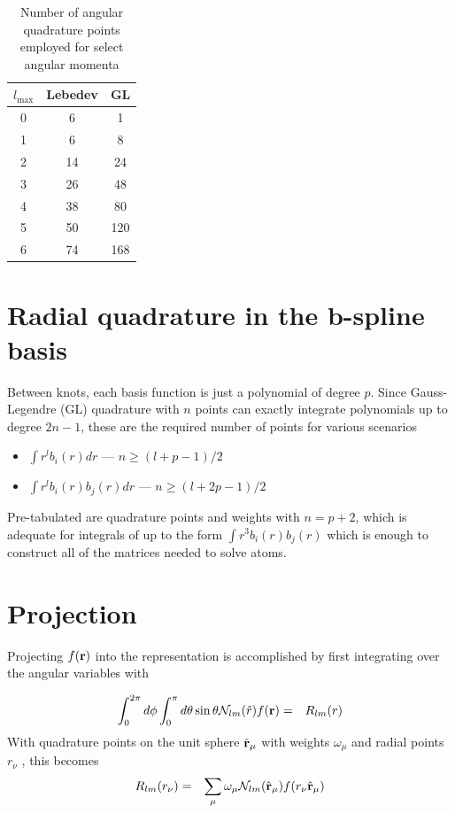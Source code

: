 \documentclass[12pt]{article}
\newcommand{\N}{\mathcal{N}}
\begin{document}
\begin{table}
  \begin{center}
  \caption{Number of angular quadrature points employed for select angular momenta}
  \begin{tabular}{ccc}
    $l_{\mbox{max}}$ & Lebedev & GL  \\ \hline
    0 & 6 & 1 \\
    1 & 6 & 8 \\
    2 & 14 & 24 \\
    3 & 26 & 48 \\
    4 & 38 & 80 \\
    5 & 50 & 120 \\
    6 & 74 & 168 \\ \hline
  \end{tabular}
  \end{center}
\end{table}

\section{Radial quadrature in the b-spline basis}

Between knots, each basis function is just a polynomial of degree $p$.  Since Gauss-Legendre (GL) quadrature with $n$ points can exactly integrate polynomials up to degree $2n-1$, these are the required number of points for various scenarios
\begin{itemize}
\item $\int r^l b_i(r) dr$ --- $n \ge (l+p-1)/2$
\item $\int r^l b_i(r) b_j(r) dr$ --- $n \ge (l+2p-1)/2$
\end{itemize}
Pre-tabulated are quadrature points and weights with $n=p+2$, which is adequate for integrals of up to the form $\int r^3 b_i(r) b_j(r)$ which is enough to construct all of the matrices needed to solve atoms.

\section{Projection}

Projecting $f(\vb{r})$ into the representation is accomplished by first integrating over the angular variables with

\begin{eqnarray}
  \int_0^{2 \pi} d\phi \int_0^\pi d\theta \sin \theta  \N_{lm} (\hat{r}) f(\vb{r}) & = & R_{lm}(r) 
\end{eqnarray}
With quadrature points on the unit sphere $\hat{\vb{r}}_\mu$ with
weights $\omega_\mu$ and radial points $r_\nu$ , this becomes
\begin{eqnarray}
  R_{lm}(r_\nu) & = & \sum_\mu \omega_\mu \N_{lm} (\hat{\vb{r}}_\mu) f(r_\nu \hat{\vb{r}}_\mu)
\end{eqnarray}
\end{document}
